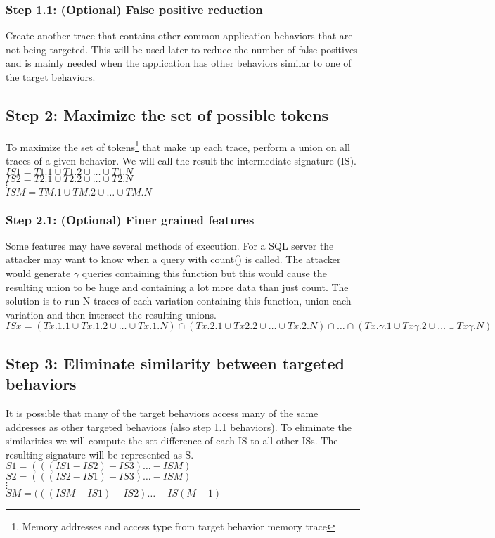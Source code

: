 \documentclass[11pt,a4paper, titlepage, oneside]{article}
\begin{document}
\subsubsection{Step 1.1: (Optional) False positive reduction}
Create another trace that contains other common application behaviors that are not being targeted. This will be used later to reduce the number of false positives and is mainly needed when the application has other behaviors similar to one of the target behaviors.

\subsection{Step 2: Maximize the set of possible tokens}
To maximize the set of tokens\footnote{Memory addresses and access type from target behavior memory trace} that make up each trace, perform a union on all traces of a given behavior.  We will call the result the intermediate signature (IS). \\
$IS1 = T1.1\cup T1.2\cup\ldots\cup T1.N$ \\
$IS2 = T2.1\cup T2.2\cup\ldots\cup T2.N$ \\
$\vdots$ \\
$ISM = TM.1\cup TM.2\cup\ldots\cup TM.N$ 

\subsubsection{Step 2.1: (Optional) Finer grained features}
Some features may have several methods of execution. For a SQL server the attacker may want to know when a query with count() is called. The attacker would generate $\gamma$ queries containing this function but this would cause the resulting union to be huge and containing a lot more data than just count. The solution is to run N traces of each variation containing this function, union each variation and then intersect the resulting unions. \\
$ISx = (Tx.1.1\cup Tx.1.2\cup\ldots\cup Tx.1.N)\cap(Tx.2.1\cup Tx2.2\cup\ldots\cup Tx.2.N)\cap\ldots\cap(Tx.\gamma.1\cup Tx\gamma.2\cup\ldots\cup Tx\gamma.N)$

\subsection{Step 3: Eliminate similarity between targeted behaviors}
It is possible that many of the target behaviors access many of the same addresses as other targeted behaviors (also step 1.1 behaviors). To eliminate the similarities we will compute the set difference of each IS to all other ISs. The resulting signature will be represented as S. \\
$S1 = (((IS1 - IS2) - IS3)\ldots - ISM)$ \\
$S2 = (((IS2 - IS1) - IS3)\ldots - ISM)$ \\
$\vdots$ \\
$SM = (((ISM - IS1) - IS2)\ldots - IS(M-1)$ 
\end{document}
